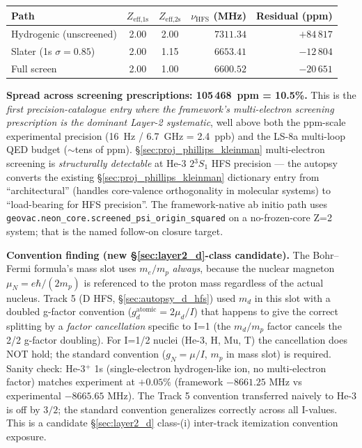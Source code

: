 \documentclass[11pt]{article}
\begin{document}
\begin{center}\small
\begin{tabular}{l c c r r}
\toprule
Path & $Z_\text{eff,1s}$ & $Z_\text{eff,2s}$ & $\nu_\text{HFS}$ (MHz) &
Residual (ppm) \\
\midrule
Hydrogenic (unscreened) & 2.00 & 2.00 & $7311.34$ & $+84\,817$ \\
Slater (1s $\sigma=0.85$) & 2.00 & 1.15 & $6653.41$ & $-12\,804$ \\
Full screen & 2.00 & 1.00 & $6600.52$ & $-20\,651$ \\
\bottomrule
\end{tabular}
\end{center}

\textbf{Spread across screening prescriptions: 105\,468~ppm = 10.5\%.}
This is the \emph{first precision-catalogue entry where the framework's
multi-electron screening prescription is the dominant Layer-2
systematic}, well above both the ppm-scale experimental precision
(16~Hz / 6.7~GHz = 2.4~ppb) and the LS-8a multi-loop QED budget
($\sim$tens of ppm). \S\ref{sec:proj_phillips_kleinman} multi-electron
screening is \emph{structurally detectable} at He-3 $2{}^3\!S_1$ HFS
precision --- the autopsy converts the existing
\S\ref{sec:proj_phillips_kleinman} dictionary entry from
``architectural'' (handles core-valence orthogonality in molecular
systems) to ``load-bearing for HFS precision''. The framework-native
ab initio path uses
\texttt{geovac.neon\_core.screened\_psi\_origin\_squared} on a
no-frozen-core Z=2 system; that is the named follow-on closure target.

\textbf{Convention finding (new \S\ref{sec:layer2_d}-class candidate).}
The Bohr--Fermi formula's mass slot uses $m_e/m_p$ \emph{always},
because the nuclear magneton $\mu_N = e\hbar/(2 m_p)$ is referenced
to the proton mass regardless of the actual nucleus. Track 5 (D HFS,
\S\ref{sec:autopsy_d_hfs}) used $m_d$ in this slot with a doubled
g-factor convention ($g_d^\text{atomic} = 2\mu_d/I$) that happens to
give the correct splitting by a \emph{factor cancellation} specific to
I=1 (the $m_d/m_p$ factor cancels the 2/2 g-factor doubling). For
I=1/2 nuclei (He-3, H, Mu, T) the cancellation does NOT hold; the
standard convention ($g_N = \mu/I$, $m_p$ in mass slot) is required.
Sanity check: He-3$^+$ 1s (single-electron hydrogen-like ion, no
multi-electron factor) matches experiment at \textbf{$+0.05\%$}
(framework $-8661.25$ MHz vs experimental $-8665.65$ MHz). The Track 5
convention transferred naively to He-3 is off by $3/2$; the standard
convention generalizes correctly across all I-values. This is a
candidate \S\ref{sec:layer2_d} class-(i) inter-track itemization
convention exposure.
\end{document}
